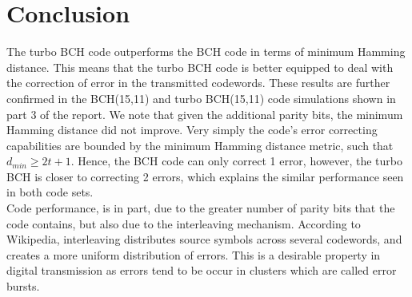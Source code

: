 \documentclass{article}
\begin{document}
\section{Conclusion}
The turbo BCH code outperforms the BCH code in terms of minimum Hamming distance. This means that the turbo BCH code is better equipped to deal with the correction of error in the transmitted codewords. These results are further confirmed in the BCH(15,11) and turbo BCH(15,11) code simulations shown in part 3 of the report. We note that given the additional parity bits, the minimum Hamming distance did not improve. Very simply the code's error correcting capabilities are bounded by the minimum Hamming distance metric, such that $d_{min} \geq 2t + 1$. Hence, the BCH code can only correct 1 error, however, the turbo BCH is closer to correcting 2 errors, which explains the similar performance seen in both code sets.\\

Code performance, is in part, due to the greater number of parity bits that the code contains, but also due to the interleaving mechanism. According to Wikipedia, interleaving distributes source symbols across several codewords, and creates a more uniform distribution of errors. This is a desirable property in digital transmission as errors tend to be occur in clusters which are called error bursts. 

\newpage
\end{document}
